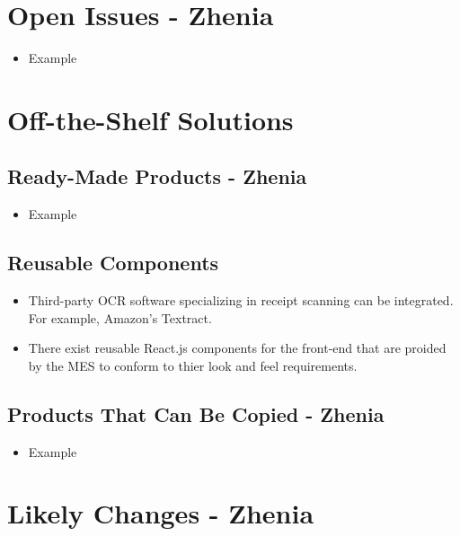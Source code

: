 \documentclass[12pt]{article}
\begin{document}
\section{Open Issues - Zhenia}
  \begin{itemize}
    \item Example
  \end{itemize}

\section{Off-the-Shelf Solutions}
  \subsection{Ready-Made Products - Zhenia}
    \begin{itemize}
      \item Example
    \end{itemize}

  \subsection{Reusable Components}
    \begin{itemize}
      \item Third-party OCR software specializing in receipt scanning can be integrated. For example, Amazon's Textract.
      \item There exist reusable React.js components for the front-end that are proided by the MES to conform to thier look and feel requirements.
    \end{itemize}

  \subsection{Products That Can Be Copied - Zhenia}
    \begin{itemize}
      \item Example
    \end{itemize}

\section{Likely Changes - Zhenia}    
\end{document}
